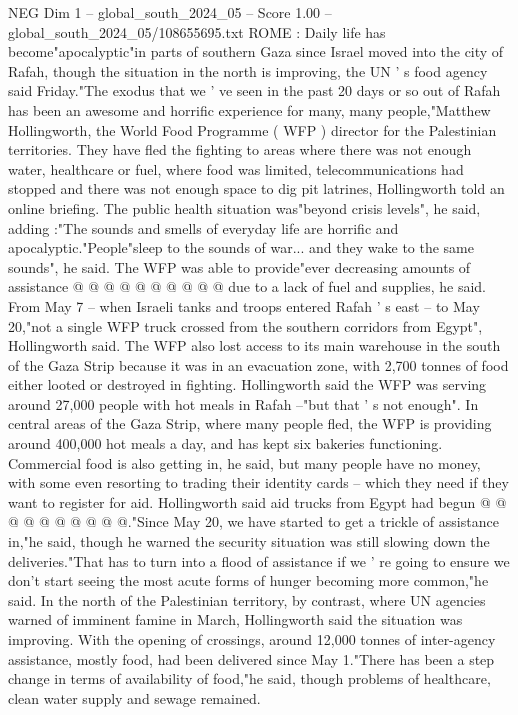 \begin{textsample}{NEG Dim 1 – global\_south\_2024\_05 – Score 1.00 – global\_south\_2024\_05/108655695.txt}  \label{ex:f1_neg_208}
ROME : Daily life has become"apocalyptic"in parts of southern Gaza since Israel moved into the city of Rafah, though the situation in the north is improving, the UN ' s food agency said Friday."The exodus that we ' ve seen in the past 20 days or so out of Rafah has been an awesome and horrific experience for many, many people,"Matthew Hollingworth, the World Food Programme ( WFP ) director for the Palestinian territories.
They have fled the fighting to areas where there was not enough water, healthcare or fuel, where food was limited, telecommunications had stopped and there was not enough space to dig pit latrines, Hollingworth told an online briefing.
The public health situation was"beyond crisis levels", he said, adding :"The sounds and smells of everyday life are horrific and apocalyptic."People"sleep to the sounds of war... and they wake to the same sounds", he said.
The WFP was able to provide"ever decreasing amounts of assistance @ @ @ @ @ @ @ @ @ @ due to a lack of fuel and supplies, he said.
From May 7 -- when Israeli tanks and troops entered Rafah ' s east -- to May 20,"not a single WFP truck crossed from the southern corridors from Egypt", Hollingworth said.
The WFP also lost access to its main warehouse in the south of the Gaza Strip because it was in an evacuation zone, with 2,700 tonnes of food either looted or destroyed in fighting.
Hollingworth said the WFP was serving around 27,000 people with hot meals in Rafah --"but that ' s not enough".
In central areas of the Gaza Strip, where many people fled, the WFP is providing around 400,000 hot meals a day, and has kept six bakeries functioning.
Commercial food is also getting in, he said, but many people have no money, with some even resorting to trading their identity cards -- which they need if they want to register for aid.
Hollingworth said aid trucks from Egypt had begun @ @ @ @ @ @ @ @ @ @."Since May 20, we have started to get a trickle of assistance in,"he said, though he warned the security situation was still slowing down the deliveries."That has to turn into a flood of assistance if we ' re going to ensure we don't start seeing the most acute forms of hunger becoming more common,"he said.
In the north of the Palestinian territory, by contrast, where UN agencies warned of imminent famine in March, Hollingworth said the situation was improving.
With the opening of crossings, around 12,000 tonnes of inter-agency assistance, mostly food, had been delivered since May 1."There has been a step change in terms of availability of food,"he said, though problems of healthcare, clean water supply and sewage remained.

\end{textsample}

